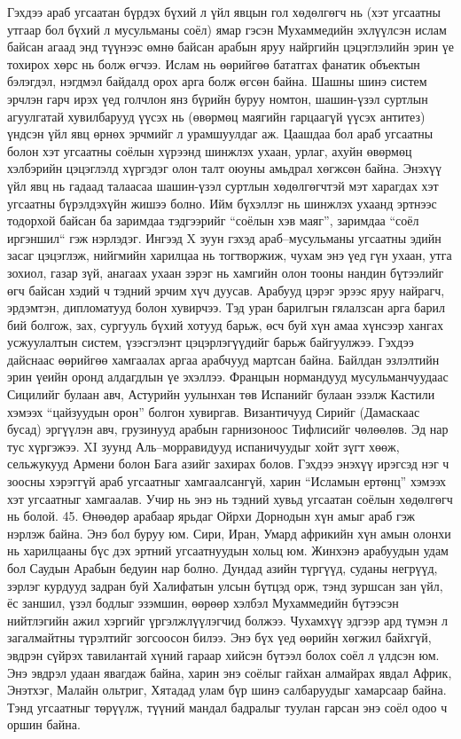 Гэхдээ араб угсаатан бүрдэх бүхий л үйл явцын гол хөдөлгөгч нь (хэт угсаатны утгаар бол бүхий л мусульманы соёл) ямар гэсэн Мухаммедийн эхлүүлсэн ислам байсан агаад энд түүнээс өмнө байсан арабын яруу найргийн цэцэглэлийн эрин үе тохирох хөрс нь болж өгчээ. Ислам нь өөрийгөө бататгах фанатик объектын бэлэгдэл, нэгдмэл байдалд орох арга болж өгсөн байна. Шашны шинэ систем эрчлэн гарч ирэх үед голчлон янз бүрийн буруу номтон, шашин-үзэл суртлын агуулгатай хувилбарууд үүсэх нь (өвөрмөц маягийн гарцаагүй үүсэх антитез) үндсэн үйл явц өрнөх эрчмийг л урамшуулдаг аж. Цаашдаа бол араб угсаатны болон хэт угсаатны соёлын хүрээнд шинжлэх ухаан, урлаг, ахуйн өвөрмөц хэлбэрийн цэцэглэлд хүргэдэг олон талт оюуны амьдрал хөгжсөн байна. Энэхүү үйл явц нь гадаад талаасаа шашин-үзэл суртлын хөдөлгөгчтэй мэт харагдах хэт угсаатны бүрэлдэхүйн жишээ болно. Ийм бүхэллэг нь шинжлэх ухаанд эртнээс тодорхой байсан ба заримдаа тэдгээрийг “соёлын хэв маяг”, заримдаа “соёл иргэншил“ гэж нэрлэдэг.
Ингээд X зуун гэхэд араб–мусульманы угсаатны эдийн засаг цэцэглэж, нийгмийн харилцаа нь тогтворжиж, чухам энэ үед гүн ухаан, утга зохиол, газар зүй, анагаах ухаан зэрэг нь хамгийн олон тооны нандин бүтээлийг өгч байсан хэдий ч тэдний эрчим хүч дуусав. Арабууд цэрэг эрээс яруу найрагч, эрдэмтэн, дипломатууд болон хувирчээ. Тэд уран барилгын гялалзсан арга барил бий болгож, зах, сургууль бүхий хотууд барьж, өсч буй хүн амаа хүнсээр хангах усжуулалтын систем, үзэсгэлэнт цэцэрлэгүүдийг барьж байгуулжээ. Гэхдээ дайснаас өөрийгөө хамгаалах аргаа арабчууд мартсан байна. Байлдан эзлэлтийн эрин үеийн оронд алдагдлын үе эхэллээ.
Францын нормандууд мусульманчуудаас Сицилийг булаан авч, Астурийн уулынхан төв Испанийг булаан эзэлж Кастили хэмээх “цайзуудын орон” болгон хувиргав. Византичууд Сирийг (Дамаскаас бусад) эргүүлэн авч, грузинууд арабын гарнизоноос Тифлисийг чөлөөлөв. Эд нар тус хүргэжээ. XI зуунд Аль–морравидууд испаничуудыг хойт зүгт хөөж, сельжукууд Армени болон Бага азийг захирах болов. Гэхдээ энэхүү ирэгсэд нэг ч зоосны хэрэггүй араб угсаатныг хамгаалсангүй, харин “Исламын ертөнц” хэмээх хэт угсаатныг хамгаалав. Учир нь энэ нь тэдний хувьд угсаатан соёлын хөдөлгөгч нь болой.
45. Өнөөдөр арабаар ярьдаг Ойрхи Дорнодын хүн амыг араб гэж нэрлэж байна. Энэ бол буруу юм. Сири, Иран, Умард африкийн хүн амын олонхи нь харилцааны бүс дэх эртний угсаатнуудын хольц юм. Жинхэнэ арабуудын удам бол Саудын Арабын бедуин нар болно.
Дундад азийн түргүүд, суданы негрүүд, зэрлэг курдууд задран буй Халифатын улсын бүтцэд орж, тэнд зуршсан зан үйл, ёс заншил, үзэл бодлыг эзэмшин, өөрөөр хэлбэл Мухаммедийн бүтээсэн нийтлэгийн ажил хэргийг үргэлжлүүлэгчид болжээ. Чухамхүү эдгээр ард түмэн л загалмайтны түрэлтийг зогсоосон билээ. Энэ бүх үед өөрийн хөгжил байхгүй, эвдрэн сүйрэх тавилантай хүний гараар хийсэн бүтээл болох соёл л үлдсэн юм. Энэ эвдрэл удаан явагдаж байна, харин энэ соёлыг гайхан алмайрах явдал Африк, Энэтхэг, Малайн ольтриг, Хятадад улам бүр шинэ салбаруудыг хамарсаар байна. Тэнд угсаатныг төрүүлж, түүний мандал бадралыг туулан гарсан энэ соёл одоо ч оршин байна.
